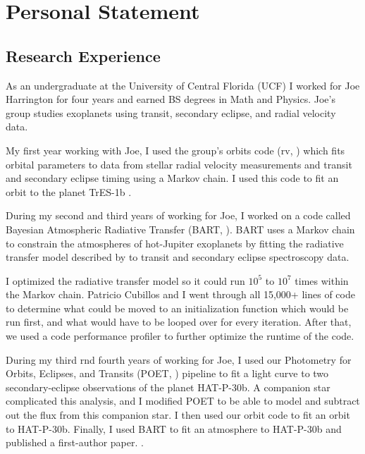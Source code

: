 \documentclass[preprint]{aastex}
\begin{document}
\section*{Personal Statement}
\vspace{-6mm}

\begin{multicols}{2}

\vspace{-3mm}
\subsection*{Research Experience}
\vspace{-3mm}

As an undergraduate at the University of Central Florida (UCF) I worked for Joe
Harrington for four years and earned BS degrees in Math and Physics. Joe's
group studies exoplanets using transit, secondary eclipse, and radial velocity
data.

My first year working with Joe, I used the group's orbits code (rv,
\citealp{CampoOrbit}) which fits orbital parameters to data from stellar radial
velocity measurements and transit and secondary eclipse timing using a Markov
chain. I used this code to fit an orbit to the planet TrES-1b \citep{tres1}. 

During my second and third years of working for Joe, I worked on a code called
Bayesian Atmospheric Radiative Transfer (BART, \citealp{BARTI}). BART uses a
Markov chain to constrain the atmospheres of hot-Jupiter exoplanets by fitting
the radiative transfer model described by \cite{RojoThesis} to transit and
secondary eclipse spectroscopy data. 

I optimized the radiative transfer model so it could run $10^5$ to $10^7$ times
within the Markov chain. Patricio Cubillos and I went through all 15,000+ lines
of code to determine what could be moved to an initialization function which
would be run first, and what would have to be looped over for every iteration.
After that, we used a code performance profiler to further optimize the runtime
of the code.

During my third rnd fourth years of working for Joe, I used our Photometry for
Orbits, Eclipses, and Transits (POET, \cite{StevensonPOET}) pipeline to fit a
light curve to two secondary-eclipse observations of the planet HAT-P-30b. A
companion star complicated this analysis, and I modified POET to be able to
model and subtract out the flux from this companion star. I then used our orbit
code to fit an orbit to HAT-P-30b.  Finally, I used BART to fit an atmosphere
to HAT-P-30b and published a first-author paper.  \citep{HAT30}.


\end{multicols}
\end{document}
